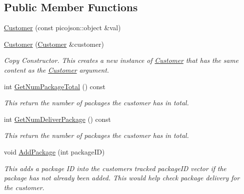 \subsection*{Public Member Functions}
\begin{DoxyCompactItemize}
\item 
\hyperlink{classcsci3081_1_1Customer_abbbf2b0f11d653b3cb0c2926064a830a}{Customer} (const picojson\+::object \&val)
\item 
\hyperlink{classcsci3081_1_1Customer_ad4eec3e1ba0f5dbe815e8552eb1715e2}{Customer} (\hyperlink{classcsci3081_1_1Customer}{Customer} \&customer)
\begin{DoxyCompactList}\small\item\em Copy Constructor. This creates a new instance of \hyperlink{classcsci3081_1_1Customer}{Customer} that has the same content as the \hyperlink{classcsci3081_1_1Customer}{Customer} argument. \end{DoxyCompactList}\item 
\mbox{\label{classcsci3081_1_1Customer_a9547aa6dd6c208f56ca02f945bd9441e}} 
int \hyperlink{classcsci3081_1_1Customer_a9547aa6dd6c208f56ca02f945bd9441e}{Get\+Num\+Package\+Total} () const
\begin{DoxyCompactList}\small\item\em This return the number of packages the customer has in total. \end{DoxyCompactList}\item 
\mbox{\label{classcsci3081_1_1Customer_a1f6ddb2ecac6de13f8e5631483b959ea}} 
int \hyperlink{classcsci3081_1_1Customer_a1f6ddb2ecac6de13f8e5631483b959ea}{Get\+Num\+Deliver\+Package} () const
\begin{DoxyCompactList}\small\item\em This return the number of packages the customer has in total. \end{DoxyCompactList}\item 
void \hyperlink{classcsci3081_1_1Customer_a7eba42384d9648731c81862c36fed1ec}{Add\+Package} (int package\+ID)
\begin{DoxyCompactList}\small\item\em This adds a package ID into the customer\textquotesingle{}s tracked package\+ID vector if the package has not already been added. This would help check package delivery for the customer. \end{DoxyCompactList}\item 

\end{DoxyCompactItemize}
